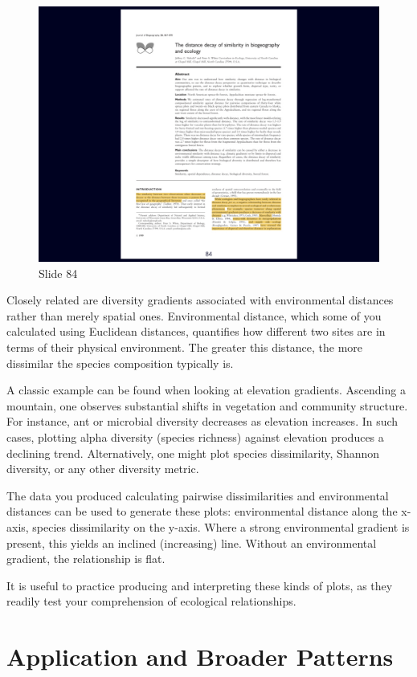 \documentclass[
  12pt,
]{book}
\begin{document}
\begin{figure}[ht]
\centering
\includegraphics[width=0.8\linewidth]{../images/BDC334/BDC334-084.jpeg}
\caption*{Slide 84}
\end{figure}

Closely related are diversity gradients associated with environmental
distances rather than merely spatial ones. Environmental distance, which
some of you calculated using Euclidean distances, quantifies how
different two sites are in terms of their physical environment. The
greater this distance, the more dissimilar the species composition
typically is.

A classic example can be found when looking at elevation gradients.
Ascending a mountain, one observes substantial shifts in vegetation and
community structure. For instance, ant or microbial diversity decreases
as elevation increases. In such cases, plotting alpha diversity (species
richness) against elevation produces a declining trend. Alternatively,
one might plot species dissimilarity, Shannon diversity, or any other
diversity metric.

The data you produced calculating pairwise dissimilarities and
environmental distances can be used to generate these plots:
environmental distance along the x-axis, species dissimilarity on the
y-axis. Where a strong environmental gradient is present, this yields an
inclined (increasing) line. Without an environmental gradient, the
relationship is flat.

It is useful to practice producing and interpreting these kinds of
plots, as they readily test your comprehension of ecological
relationships.

\section{Application and Broader
Patterns}\label{application-and-broader-patterns}
\end{document}
